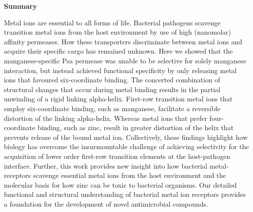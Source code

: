 \textbf{Summary}

Metal ions are essential to all forms of life. Bacterial pathogens scavenge transition metal ions from the host environment by use of high (nanomolar) affinity permeases. How these transporters discriminate between metal ions and acquire their specific cargo has remained unknown. Here we showed that the manganese-specific Psa permease was unable to be selective for solely manganese interaction, but instead achieved functional specificity by only releasing metal ions that favoured six-coordinate binding. The concerted combination of structural changes that occur during metal binding results in the partial unwinding of a rigid linking alpha-helix. First-row transition metal ions that employ six-coordinate binding, such as manganese, facilitate a reversible distortion of the linking alpha-helix. Whereas metal ions that prefer four-coordinate binding, such as zinc, result in greater distortion of the helix that prevents release of the bound metal ion. Collectively, these findings highlight how biology has overcome the insurmountable challenge of achieving selectivity for the acquisition of lower order first-row transition elements at the host-pathogen interface.  Further, this work provides new insight into how bacterial metal-receptors scavenge essential metal ions from the host environment and the molecular basis for how zinc can be toxic to bacterial organisms. Our detailed functional and structural understanding of bacterial metal ion receptors provides a foundation for the development of novel antimicrobial compounds.